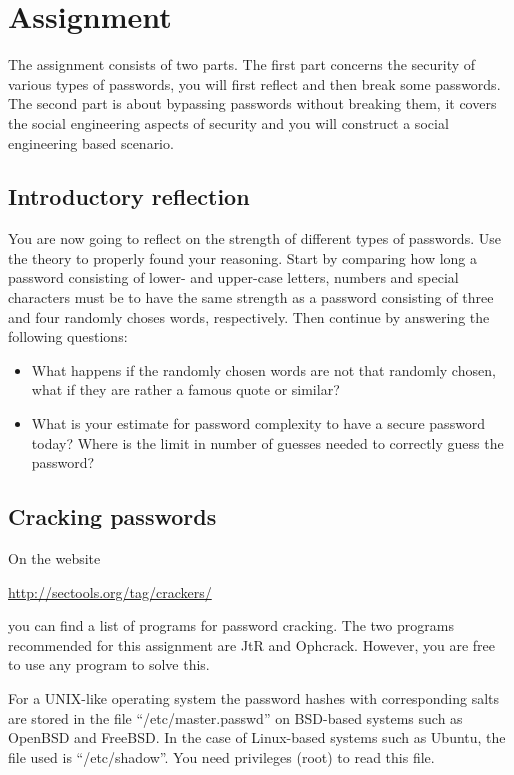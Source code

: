 \section{Assignment}
\label{sec:tasks}
The assignment consists of two parts.
The first part concerns the security of various types of passwords, you will 
first reflect and then break some passwords.
The second part is about bypassing passwords without breaking them, it covers 
the social engineering aspects of security and you will construct a social 
engineering based scenario.

\subsection{Introductory reflection}
\label{sec:reflection}
You are now going to reflect on the strength of different types of passwords.
Use the theory to properly found your reasoning.
Start by comparing how long a password consisting of lower- and upper-case 
letters, numbers and special characters must be to have the same strength as 
a password consisting of three and four randomly choses words, respectively.
Then continue by answering the following questions:
\begin{itemize}
  \item What happens if the randomly chosen words are not that randomly chosen, 
    what if they are rather a famous quote or similar?

  \item What is your estimate for password complexity to have a secure password 
    today?
    Where is the limit in number of guesses needed to correctly guess the 
    password?
\end{itemize}

\subsection{Cracking passwords}

On the website
\begin{center}
  \url{http://sectools.org/tag/crackers/}
\end{center}
you can find a list of programs for password cracking.
The two programs recommended for this assignment are
\ac{JtR} and Ophcrack.
However, you are free to use any program to solve this.

For a UNIX-like operating system the password hashes with corresponding salts 
are stored in the file \enquote{/etc/master.passwd} on BSD-based systems such 
as OpenBSD and FreeBSD.
In the case of Linux-based systems such as Ubuntu, the file used is 
\enquote{/etc/shadow}.
You need privileges (root) to read this file.

